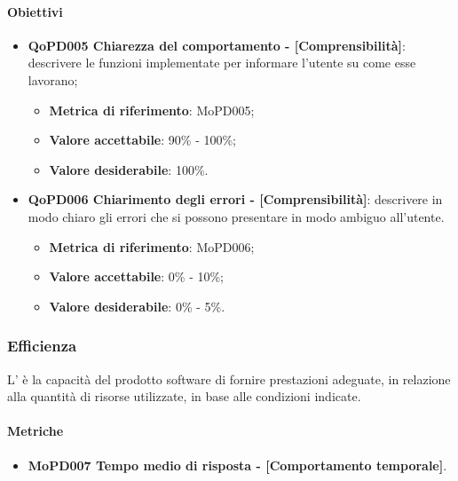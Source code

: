 \documentclass[../piano-di-qualifica.tex]{subfiles}
\begin{document}
\paragraph{Obiettivi}
\label{sub:obiettivi}
\begin{itemize}
    \item \textbf{QoPD005 Chiarezza del comportamento - [Comprensibilità]}: descrivere le funzioni implementate per informare l'utente su come esse lavorano;
        \begin{itemize}
            \item \textbf{Metrica di riferimento}: MoPD005;
            \item \textbf{Valore accettabile}: 90\% - 100\%;
            \item \textbf{Valore desiderabile}: 100\%.
        \end{itemize}
    \item \textbf{QoPD006 Chiarimento degli errori - [Comprensibilità]}: descrivere in modo chiaro gli errori che si possono presentare in modo ambiguo all'utente.
        \begin{itemize}
            \item \textbf{Metrica di riferimento}: MoPD006;
            \item \textbf{Valore accettabile}: 0\% - 10\%;
            \item \textbf{Valore desiderabile}: 0\% - 5\%.
        \end{itemize}
\end{itemize}

\subsubsection{Efficienza}%
\label{sub:efficienza}
L' è la capacità del prodotto software di fornire prestazioni adeguate, in relazione alla quantità di
risorse utilizzate, in base alle condizioni indicate.

\paragraph{Metriche}
\label{sub:metriche}
\begin{itemize}
    \item \textbf{MoPD007 Tempo medio di risposta - [Comportamento temporale]}.
\end{itemize}
\end{document}
